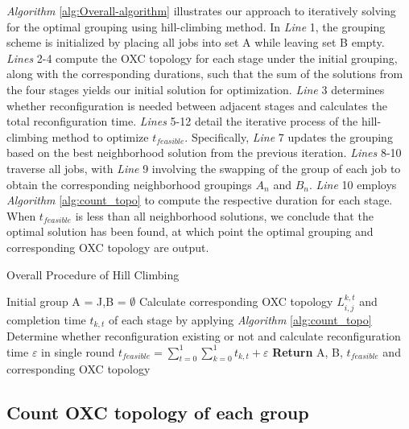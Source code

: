 \documentclass[conference]{IEEEtran}
\begin{document}
\emph{Algorithm} \ref{alg:Overall-algorithm} illustrates our approach to iteratively solving for the optimal grouping using hill-climbing method. In \emph{Line} 1, the grouping scheme is initialized by placing all jobs into set A while leaving set B empty. \emph{Lines} 2-4 compute the OXC topology for each stage under the initial grouping, along with the corresponding durations, such that the sum of the solutions from the four stages yields our initial solution for optimization. \emph{Line} 3 determines whether reconfiguration is needed between adjacent stages and calculates the total reconfiguration time. \emph{Lines} 5-12 detail the iterative process of the hill-climbing method to optimize $t_{feasible}$. Specifically, \emph{Line} 7 updates the grouping based on the best neighborhood solution from the previous iteration. \emph{Lines} 8-10 traverse all jobs, with \emph{Line} 9 involving the swapping of the group of each job to obtain the corresponding neighborhood groupings $A_n$ and $B_n$. \emph{Line} 10 employs \emph{Algorithm} \ref{alg:count_topo} to compute the respective duration for each stage. When \(t_{feasible}\) is less than all neighborhood solutions, we conclude that the optimal solution has been found, at which point the optimal grouping and corresponding OXC topology are output.

\begin{algorithm}
	\caption{Overall Procedure of Hill Climbing}
	\label{alg:Overall-algorithm}
	\LinesNumbered
	Initial group A = J,B = $\emptyset$\;
	Calculate corresponding OXC topology $L_{i,j}^{k,t}$ and completion time $t_{k,t}$ of each stage by applying \emph{Algorithm} \ref{alg:count_topo}\;
	Determine whether reconfiguration existing or not and calculate reconfiguration time $\varepsilon$ in single round\;
	$t_{feasible}=\sum_{t=0}^1\sum_{k=0}^1t_{k,t}+\varepsilon$\;
	\textbf{Return} A, B, $t_{feasible}$ and corresponding OXC topology\;
\end{algorithm}

\subsection{Count OXC topology of each group}
\end{document}
